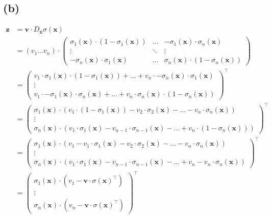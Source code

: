 \subsection*{(b)}
\begin{align*}
\boldsymbol{z} &= \boldsymbol{v} \cdot D_{\boldsymbol{x}}\sigma(\boldsymbol{x}) \\
&=
(v_1 \dots v_n)
\cdot
\begin{pmatrix}
\sigma_1(\boldsymbol{x}) \cdot (1 - \sigma_1(\boldsymbol{x})) & \dots & -\sigma_1(\boldsymbol{x}) \cdot \sigma_n(\boldsymbol{x}) \\
\vdots & \ddots & \vdots \\
-\sigma_n(\boldsymbol{x}) \cdot \sigma_1(\boldsymbol{x}) & \dots & \sigma_n(\boldsymbol{x}) \cdot (1 - \sigma_n(\boldsymbol{x}))
\end{pmatrix} \\
&=
\begin{pmatrix}
v_1 \cdot \sigma_1(\boldsymbol{x}) \cdot (1 - \sigma_1(\boldsymbol{x})) + \dots + v_n \cdot -\sigma_n(\boldsymbol{x}) \cdot \sigma_1(\boldsymbol{x}) \\
\vdots \\
v_1 \cdot -\sigma_1(\boldsymbol{x}) \cdot \sigma_n(\boldsymbol{x}) + \dots + v_n \cdot \sigma_n(\boldsymbol{x}) \cdot (1 - \sigma_n(\boldsymbol{x}))
\end{pmatrix}^\top \\
&=
\begin{pmatrix}
\sigma_1(\boldsymbol{x}) \cdot (v_1 \cdot (1 - \sigma_1(\boldsymbol{x})) - v_2 \cdot \sigma_2(\boldsymbol{x}) - \dots - v_n \cdot \sigma_n(\boldsymbol{x})) \\
\vdots \\
\sigma_n(\boldsymbol{x}) \cdot (v_1 \cdot \sigma_1(\boldsymbol{x}) - v_{n-1} \cdot \sigma_{n-1}(\boldsymbol{x}) - \dots + v_n \cdot (1 - \sigma_n(\boldsymbol{x})))
\end{pmatrix}^\top \\
&=
\begin{pmatrix}
\sigma_1(\boldsymbol{x}) \cdot (v_1  - v_1 \cdot \sigma_1(\boldsymbol{x}) - v_2 \cdot \sigma_2(\boldsymbol{x}) - \dots - v_n \cdot \sigma_n(\boldsymbol{x})) \\
\vdots \\
\sigma_n(\boldsymbol{x}) \cdot (v_1 \cdot \sigma_1(\boldsymbol{x}) - v_{n-1} \cdot \sigma_{n-1}(\boldsymbol{x}) - \dots + v_n - v_n \cdot \sigma_n(\boldsymbol{x}))
\end{pmatrix}^\top \\
&=
\begin{pmatrix}
\sigma_1(\boldsymbol{x}) \cdot (v_1  - \boldsymbol{v} \cdot \sigma(\boldsymbol{x})^\top) \\
\vdots \\
\sigma_n(\boldsymbol{x}) \cdot (v_n - \boldsymbol{v} \cdot \sigma(\boldsymbol{x})^\top)
\end{pmatrix}^\top
\end{align*}

